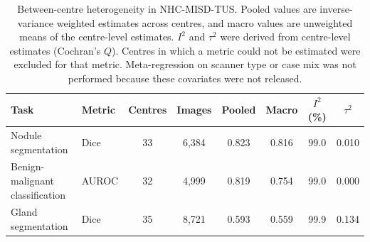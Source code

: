 \begin{table}[p]
\centering
\begin{threeparttable}

\caption{Between-centre heterogeneity in NHC-MISD-TUS. Pooled values are inverse-variance weighted estimates across centres, and macro values are unweighted means of the centre-level estimates. $I^2$ and $\tau^2$ were derived from centre-level estimates (Cochran's $Q$). Centres in which a metric could not be estimated were excluded for that metric. Meta-regression on scanner type or case mix was not performed because these covariates were not released.}
\label{tab:nhc_heterogeneity}

\footnotesize
\setlength{\tabcolsep}{5.5pt}
\renewcommand{\arraystretch}{1.08}

\begin{tabular}{llcccccc}
\toprule
\textbf{Task} & \textbf{Metric} & \textbf{Centres} & \textbf{Images} & \textbf{Pooled} & \textbf{Macro} & \textbf{$I^2$ (\%)} & \textbf{$\tau^2$} \\
\midrule
Nodule segmentation & Dice & 33 & 6,384 & 0.823 & 0.816 & 99.0 & 0.010 \\
Benign-malignant classification & AUROC & 32 & 4,999 & 0.819 & 0.754 & 99.0 & 0.000 \\
Gland segmentation & Dice & 35 & 8,721 & 0.593 & 0.559 & 99.9 & 0.134 \\
\bottomrule
\end{tabular}
\end{threeparttable}
\end{table}
\clearpage
